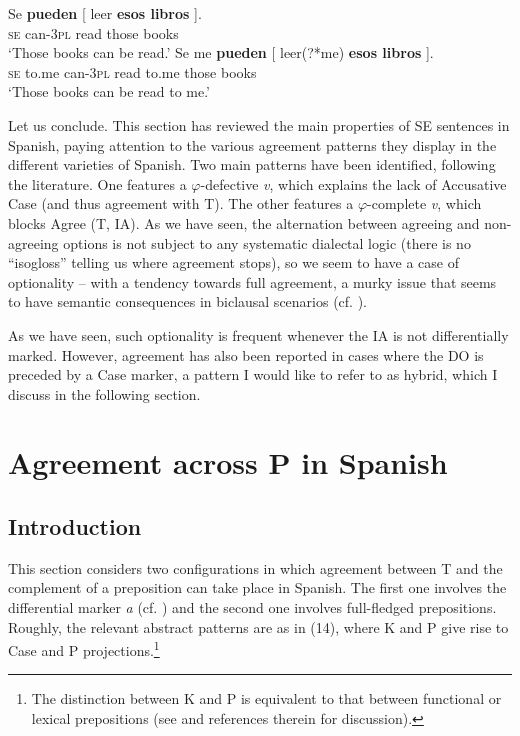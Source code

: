 \documentclass[output=paper]{langsci/langscibook}
\begin{document}
\ea%
    \label{ex:gallego:13}
    \ea
    \gll Se  \textbf{pueden}  [ leer   \textbf{esos    libros} ].\\
         \textsc{se} can\textsc{{}-3pl}   read  those  books\\
    \glt ‘Those books can be read.’
    \ex
    \gll Se   me      \textbf{pueden}  [ leer(?*me)    \textbf{esos    libros} ].\\
         \textsc{se} to.me  can\textsc{{}-3pl}    read   to.me  those  books\\
    \glt ‘Those books can be read to me.’
    \z
\z

Let us conclude. This section has reviewed the main properties of SE sentences in Spanish, paying attention to the various agreement patterns they display in the different varieties of Spanish. Two main patterns have been identified, following the literature. One features a $\varphi $-defective \textit{v}, which explains the lack of Accusative Case (and thus agreement with T). The other features a $\varphi $-complete \textit{v}, which blocks Agree (T, IA). As we have seen, the alternation between agreeing and non-agreeing options is not subject to any systematic dialectal logic (there is no “isogloss” telling us where agreement stops), so we seem to have a case of optionality – with a tendency towards full agreement, a murky issue that seems to have semantic consequences in biclausal scenarios (cf. \citealt{Martin1998,Fernández-Serrano2016}). 

As we have seen, such optionality is frequent whenever the IA is not differentially marked. However, agreement has also been reported in cases where the DO is preceded by a Case marker, a pattern I would like to refer to as hybrid, which I discuss in the following section.

\section{Agreement across P in Spanish} %
\subsection{Introduction}%

This section considers two configurations in which agreement between T and the complement of a preposition can take place in Spanish. The first one involves the differential marker \textit{a} (cf. \citealt{Torrego1998,López2012}) and the second one involves full-fledged prepositions. Roughly, the relevant abstract patterns are as in (14), where K and P give rise to Case and P projections.\footnote{The distinction between K and P is equivalent to that between functional or lexical prepositions (see \citealt{Riemsdijk1990} and references therein for discussion).}
\end{document}
